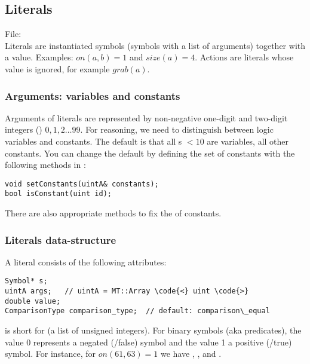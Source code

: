 \documentclass[10pt,twoside,twocolumn,fleqn]{article}
\begin{document}
    








\subsection{Literals}

File: \\


Literals are instantiated symbols (symbols with a list of arguments)
together with a value. Examples: $on(a,b)=1$ and $size(a)=4$. Actions
are literals whose value is ignored, for example $grab(a)$.


\subsubsection{Arguments: variables and constants}
\label{sec:literals:arguments}

Arguments of literals are represented by non-negative one-digit and
two-digit integers () $0,1,2 \dots 99$. For reasoning, we need
to distinguish between logic variables and constants. The default is that
all s $<10$ are variables, all other constants. You can
change the default by defining the set of constants with the following
methods in :
\begin{lstlisting}
void setConstants(uintA& constants);
bool isConstant(uint id);
\end{lstlisting}
There are also appropriate methods to fix the  of
constants.


\subsubsection{Literals data-structure}

A literal consists of the following attributes:
\begin{lstlisting}
Symbol* s;
uintA args;   // uintA = MT::Array \code{<} uint \code{>}
double value;
ComparisonType comparison_type;  // default: comparison\_equal
\end{lstlisting}
 is short for  (a list of unsigned
integers). For binary symbols (aka predicates), the value 0 represents a
negated (/false) symbol and the value 1 a positive (/true) symbol. For
instance, for $on(61,63)=1$ we have ,
,  and .
\end{document}
